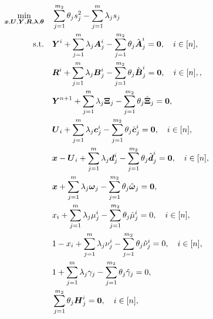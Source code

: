 \documentclass[opre,nonblindrev]{informs3} %
\begin{document}
\begin{appendices}
\begin{theorem}
\begin{subequations}
			\begin{align}
				\displaystyle \min_{\boldsymbol{x}, \boldsymbol{U}, \boldsymbol{Y}, \boldsymbol{R}, \boldsymbol{\lambda}, \boldsymbol{\theta}} &\quad \sum_{j=1}^{m_2} \theta_j s_j^2 - \sum_{j=1}^{m} \lambda_j s_j \nonumber \\
				{\rm s.t.} &\quad \boldsymbol{Y}^i + \sum_{j=1}^{m} \lambda_j \boldsymbol{A}_j^i - \sum_{j=1}^{m_2} \theta_j \Hat{\boldsymbol{A}}_j^i = \boldsymbol{0}, \quad i \in [n], \label{eq:gersh_degree3_a} \\ 
                &\quad \boldsymbol{R}^i + \sum_{j=1}^{m} \lambda_j \boldsymbol{B}_j^i - \sum_{j=1}^{m_2} \theta_j \Hat{\boldsymbol{B}}_j^i = \boldsymbol{0}, \quad i \in [n],,  \label{eq:eq:gersh_degree3_b} \\ 
                &\quad \boldsymbol{Y}^{n+1} + \sum_{j=1}^{m} \lambda_j \boldsymbol{\Xi}_j - \sum_{j=1}^{m_2} \theta_j \Hat{\boldsymbol{\Xi}}_j = \boldsymbol{0}, \label{eq:eq:gersh_degree3_c} \\ 
                 &\quad \boldsymbol{U}_i + \sum_{j=1}^{m} \lambda_j \boldsymbol{c}_j^i - \sum_{j=1}^{m_2} \theta_j \Hat{\boldsymbol{c}}_j^i = \boldsymbol{0}, \quad i \in [n], \label{eq:eq:gersh_degree3_d} \\ 
                &\quad \boldsymbol{x}-\boldsymbol{U}_i + \sum_{j=1}^{m} \lambda_j \boldsymbol{d}_j^i - \sum_{j=1}^{m_2} \theta_j \Hat{\boldsymbol{d}}_j^i = \boldsymbol{0}, \quad i \in [n], \label{eq:eq:gersh_degree3_e} \\  
                &\quad \boldsymbol{x} + \sum_{j=1}^{m} \lambda_j \boldsymbol{\omega}_j - \sum_{j=1}^{m_2} \theta_j \Hat{\boldsymbol{\omega}}_j = \boldsymbol{0}, \label{eq:eq:gersh_degree3_f} \\ 
                &\quad x_i + \sum_{j=1}^{m} \lambda_j \mu_j^i - \sum_{j=1}^{m_2} \theta_j \Hat{\mu}_j^i = 0, \quad i \in [n], \label{eq:eq:gersh_degree3_g} \\ 
                &\quad 1-x_i + \sum_{j=1}^{m} \lambda_j \nu_j^i - \sum_{j=1}^{m_2} \theta_j \Hat{\nu}_j^i = 0, \quad i \in [n], \label{eq:gersh_degree3_h} \\ 
                &\quad 1 + \sum_{j=1}^{m} \lambda_j \gamma_j - \sum_{j=1}^{m_2} \theta_j \Hat{\gamma}_j = 0, \label{eq:gersh_degree3_i} \\ 
                &\quad \sum_{j=1}^{m_2} \theta_j \boldsymbol{H}_j^i = \boldsymbol{0}, \quad i \in [n], \label{eq:gersh_degree3_j} \\ 

\end{align}
\end{subequations}
\end{theorem}
\end{appendices}
\end{document}
